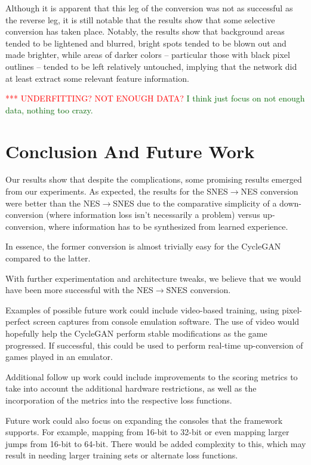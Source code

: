 \documentclass[10pt,twocolumn,letterpaper]{article}
\begin{document}
Although it is apparent that this leg of the conversion was not as successful as the reverse leg, it is still notable that the results show that some selective conversion has taken place. Notably, the results show that background areas tended to be lightened and blurred, bright spots tended to be blown out and made brighter, while areas of darker colors \--- particular those with black pixel outlines \--- tended to be left relatively untouched, implying that the network did at least extract some relevant feature information.

\textcolor{red}{*** UNDERFITTING? NOT ENOUGH DATA?}
\textcolor{darkgreen} {I think just focus on not enough data, nothing too crazy.}

\section{Conclusion And Future Work}

Our results show that despite the complications, some promising results emerged from our experiments. As expected, the results for the SNES$\rightarrow$NES conversion were better than the NES$\rightarrow$SNES due to the comparative simplicity of a down-conversion (where information loss isn't necessarily a problem) versus up-conversion, where information has to be synthesized from learned experience.

In essence, the former conversion is almost trivially easy for the CycleGAN compared to the latter.

With further experimentation and architecture tweaks, we believe that we would have been more successful with the NES$\rightarrow$SNES conversion.

Examples of possible future work could include video-based training, using pixel-perfect screen captures from console emulation software. The use of video would hopefully help the CycleGAN perform stable modifications as the game progressed. If successful, this could be used to perform real-time up-conversion of games played in an emulator.

Additional follow up work could include improvements to the scoring metrics to take into account the additional hardware restrictions, as well as the incorporation of the metrics into the respective loss functions.

Future work could also focus on expanding the consoles that the framework supports. For example, mapping from 16-bit to 32-bit or even mapping larger jumps from 16-bit to 64-bit. There would be added complexity to this, which may result in needing larger training sets or alternate loss functions.
\end{document}
